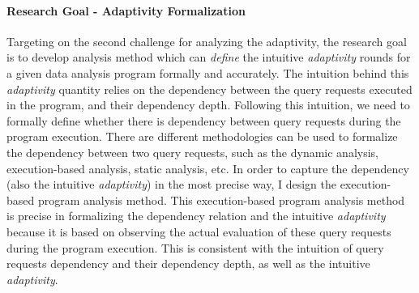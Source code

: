 \paragraph{Research Goal - Adaptivity Formalization}
Targeting on the second challenge
for analyzing the adaptivity, 
the research goal is to develop analysis method which can
\emph{define} the intuitive \emph{adaptivity} rounds for a given data analysis program formally and accurately.
The intuition behind this \emph{adaptivity} quantity relies on the dependency between the query requests 
executed in the program, and their dependency depth. 
Following this intuition, we need to formally define whether there is dependency between query requests during the program
execution.
%
There are different methodologies can be used to formalize the dependency between two query requests, such as the 
dynamic analysis, execution-based analysis, static analysis, etc.
%
In order to capture the dependency (also the intuitive \emph{adaptivity}) in the most precise way,
I design the execution-based program analysis method.
%
This execution-based program analysis method is precise in formalizing the dependency relation
and the intuitive \emph{adaptivity} because it is
based on observing the actual evaluation of these query requests during the 
program execution. This is consistent with the intuition of query requests dependency and their dependency depth,
as well as the intuitive
\emph{adaptivity}.

